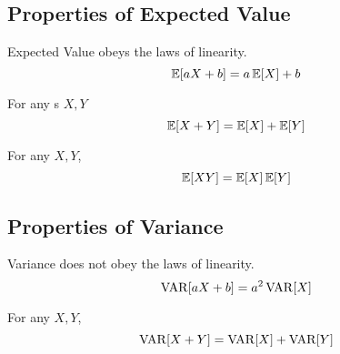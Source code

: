 \subsection{Properties of Expected Value}\label{subsec:Properties_Expected_Value}
\begin{propertylist}
\item Expected Value obeys the laws of linearity.
  \begin{equation}\label{eq:Expected_Value-Linearity}
    \operatorname{\operatorname{\mathbb{E}}}[aX + b] = a\operatorname{\operatorname{\mathbb{E}}}[X] + b
  \end{equation}\label{prop:Expected_Value-Linearity}

\item For any s $X, Y$
  \begin{equation}\label{eq:Expected_Value-Add_Random_Variables}
    \operatorname{\operatorname{\mathbb{E}}}[X+Y] = \operatorname{\operatorname{\mathbb{E}}}[X] + \operatorname{\operatorname{\mathbb{E}}}[Y]
  \end{equation}\label{prop:Expected_Value-Add_Random_Variables}

\item For any  $X,Y$,
  \begin{equation}\label{eq:Expected_Value-Multiply_Random_Variables}
    \operatorname{\operatorname{\mathbb{E}}}[XY] = \operatorname{\operatorname{\mathbb{E}}}[X] \operatorname{\operatorname{\mathbb{E}}}[Y]
  \end{equation}\label{prop:Expected_Value-Multiply_Random_Variables}
\end{propertylist}

\subsection{Properties of Variance}\label{subsec:Properties_Variance}
\begin{propertylist}
\item Variance does not obey the laws of linearity.
  \begin{equation}\label{eq:Variance-Linearity}
    \operatorname{\operatorname{VAR}}[aX + b] = a^{2}\operatorname{\operatorname{VAR}}[X]
  \end{equation}\label{prop:Variance-Linearity}

\item For any  $X,Y$,
  \begin{equation}\label{eq:Variance-Add_Random_Variables}
    \operatorname{\operatorname{VAR}}[X+Y] = \operatorname{\operatorname{VAR}}[X] + \operatorname{\operatorname{VAR}}[Y]
  \end{equation}\label{prop:Variance-Add_Random_Variables}
\end{propertylist}

